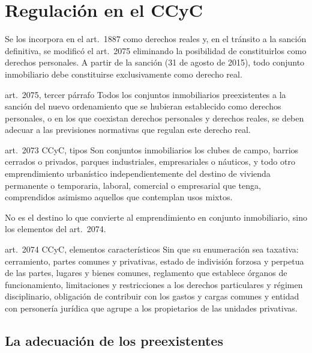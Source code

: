 \documentclass[12pt,oneside]{book}
\begin{document}
\section{Regulación en el CCyC}

Se los incorpora en el art.~1887 como derechos reales y, en el tránsito a la sanción definitiva, se modificó el art.~2075 eliminando la posibilidad de constituirlos como derechos personales. A partir de la sanción (31 de agosto de 2015), todo conjunto inmobiliario debe constituirse exclusivamente como derecho real. %

\begin{regla}{art.~2075, tercer párrafo}
Todos los conjuntos inmobiliarios preexistentes a la sanción del nuevo ordenamiento que se hubieran establecido como derechos personales, o en los que coexistan derechos personales y derechos reales, se deben adecuar a las previsiones normativas que regulan este derecho real.
\end{regla}

\begin{regla}{art.~2073 CCyC, tipos}
Son conjuntos inmobiliarios los clubes de campo, barrios cerrados o privados, parques industriales, empresariales o náuticos, y todo otro emprendimiento urbanístico independientemente del destino de vivienda permanente o temporaria, laboral, comercial o empresarial que tenga, comprendidos asimismo aquellos que contemplan usos mixtos.
\end{regla}

No es el destino lo que convierte al emprendimiento en conjunto inmobiliario, sino los elementos del art.~2074.

\begin{regla}{art.~2074 CCyC, elementos característicos}
Sin que su enumeración sea taxativa: cerramiento, partes comunes y privativas, estado de indivisión forzosa y perpetua de las partes, lugares y bienes comunes, reglamento que establece órganos de funcionamiento, limitaciones y restricciones a los derechos particulares y régimen disciplinario, obligación de contribuir con los gastos y cargas comunes y entidad con personería jurídica que agrupe a los propietarios de las unidades privativas.
\end{regla}

\subsection{La adecuación de los preexistentes}
\end{document}
